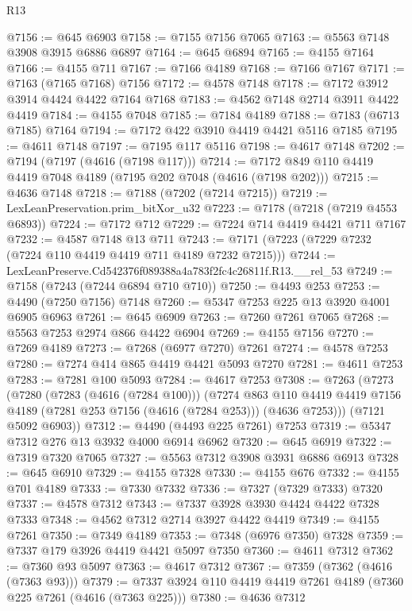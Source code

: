 \begin{lexlean}{R13}
\begin{coremodule}
@7156 := @645 @6903
@7158 := @7155 @7156 @7065
@7163 := @5563 @7148 @3908 @3915 @6886 @6897
@7164 := @645 @6894
@7165 := @4155 @7164
@7166 := @4155 @711
@7167 := @7166 @4189
@7168 := @7166 @7167
@7171 := @7163 (@7165 @7168) @7156
@7172 := @4578 @7148
@7178 := @7172 @3912 @3914 @4424 @4422 @7164 @7168
@7183 := @4562 @7148 @2714 @3911 @4422 @4419
@7184 := @4155 @7048
@7185 := @7184 @4189
@7188 := @7183 (@6713 @7185) @7164
@7194 := @7172 @422 @3910 @4419 @4421 @5116 @7185
@7195 := @4611 @7148
@7197 := @7195 @117 @5116
@7198 := @4617 @7148
@7202 := @7194 (@7197 (@4616 (@7198 @117)))
@7214 := @7172 @849 @110 @4419 @4419 @7048 @4189 (@7195 @202 @7048 (@4616 (@7198 @202)))
@7215 := @4636 @7148
@7218 := @7188 (@7202 (@7214 @7215))
@7219 := LexLeanPreservation.prim_bitXor_u32
@7223 := @7178 (@7218 (@7219 @4553 @6893))
@7224 := @7172 @712
@7229 := @7224 @714 @4419 @4421 @711 @7167
@7232 := @4587 @7148 @13 @711
@7243 := @7171 (@7223 (@7229 @7232 (@7224 @110 @4419 @4419 @711 @4189 @7232 @7215)))
@7244 := LexLeanPreserve.Cd542376f089388a4a783f2fc4c26811f.R13.__rel_53
@7249 := @7158 (@7243 (@7244 @6894 @710 @710))
@7250 := @4493 @253
@7253 := @4490 (@7250 @7156) @7148
@7260 := @5347 @7253 @225 @13 @3920 @4001 @6905 @6963
@7261 := @645 @6909
@7263 := @7260 @7261 @7065
@7268 := @5563 @7253 @2974 @866 @4422 @6904
@7269 := @4155 @7156
@7270 := @7269 @4189
@7273 := @7268 (@6977 @7270) @7261
@7274 := @4578 @7253
@7280 := @7274 @414 @865 @4419 @4421 @5093 @7270
@7281 := @4611 @7253
@7283 := @7281 @100 @5093
@7284 := @4617 @7253
@7308 := @7263
    (@7273
      (@7280
        (@7283 (@4616 (@7284 @100)))
        (@7274
          @863
          @110
          @4419
          @4419
          @7156
          @4189
          (@7281 @253 @7156 (@4616 (@7284 @253)))
          (@4636 @7253)))
      (@7121 @5092 @6903))
@7312 := @4490 (@4493 @225 @7261) @7253
@7319 := @5347 @7312 @276 @13 @3932 @4000 @6914 @6962
@7320 := @645 @6919
@7322 := @7319 @7320 @7065
@7327 := @5563 @7312 @3908 @3931 @6886 @6913
@7328 := @645 @6910
@7329 := @4155 @7328
@7330 := @4155 @676
@7332 := @4155 @701 @4189
@7333 := @7330 @7332
@7336 := @7327 (@7329 @7333) @7320
@7337 := @4578 @7312
@7343 := @7337 @3928 @3930 @4424 @4422 @7328 @7333
@7348 := @4562 @7312 @2714 @3927 @4422 @4419
@7349 := @4155 @7261
@7350 := @7349 @4189
@7353 := @7348 (@6976 @7350) @7328
@7359 := @7337 @179 @3926 @4419 @4421 @5097 @7350
@7360 := @4611 @7312
@7362 := @7360 @93 @5097
@7363 := @4617 @7312
@7367 := @7359 (@7362 (@4616 (@7363 @93)))
@7379 := @7337 @3924 @110 @4419 @4419 @7261 @4189 (@7360 @225 @7261 (@4616 (@7363 @225)))
@7380 := @4636 @7312

\end{coremodule}
\end{lexlean}
